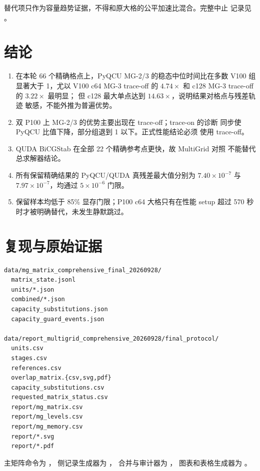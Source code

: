 \documentclass[UTF8,a4paper,11pt]{ctexart}
\begin{document}
替代项只作为容量趋势证据，不得和原大格的公平加速比混合。完整中止
记录见 。

\section{结论}

\begin{enumerate}
  \item 在本轮 66 个精确格点上，PyQCU MG-2/3 的稳态中位时间比在多数
        V100 组显著大于 1，尤以 V100 c64 MG-3 trace-off 的
        $4.74\times$ 和 c128 MG-3 trace-off 的 $3.22\times$ 最明显；
        但 c128 最大单点达到 $14.63\times$，说明结果对格点与残差轨迹
        敏感，不能外推为普遍优势。
  \item 双 P100 上 MG-2/3 的优势主要出现在 trace-off；trace-on 的诊断
        同步使 PyQCU 比值下降，部分组退到 1 以下。正式性能结论必须
        使用 trace-off。
  \item QUDA BiCGStab 在全部 22 个精确参考点更快，故 MultiGrid 对照
        不能替代总求解器结论。
  \item 所有保留精确结果的 PyQCU/QUDA 真残差最大值分别为
        $7.40\times10^{-7}$ 与 $7.97\times10^{-7}$，均通过
        $5\times10^{-6}$ 门限。
  \item 保留样本均低于 85\% 显存门限；P100 c64 大格只有在性能 setup
        超过 570 秒时才被明确替代，未发生静默跳过。
\end{enumerate}

\section{复现与原始证据}

\begin{verbatim}
data/mg_matrix_comprehensive_final_20260928/
  matrix_state.jsonl
  units/*.json
  combined/*.json
  capacity_substitutions.json
  capacity_guard_events.json

data/report_multigrid_comprehensive_20260928/final_protocol/
  units.csv
  stages.csv
  references.csv
  overlap_matrix.{csv,svg,pdf}
  capacity_substitutions.csv
  requested_matrix_status.csv
  report/mg_matrix.csv
  report/mg_levels.csv
  report/mg_memory.csv
  report/*.svg
  report/*.pdf
\end{verbatim}

主矩阵命令为
，
侧记录生成器为
，
合并与审计器为
，
图表和表格生成器为
。
\end{document}
